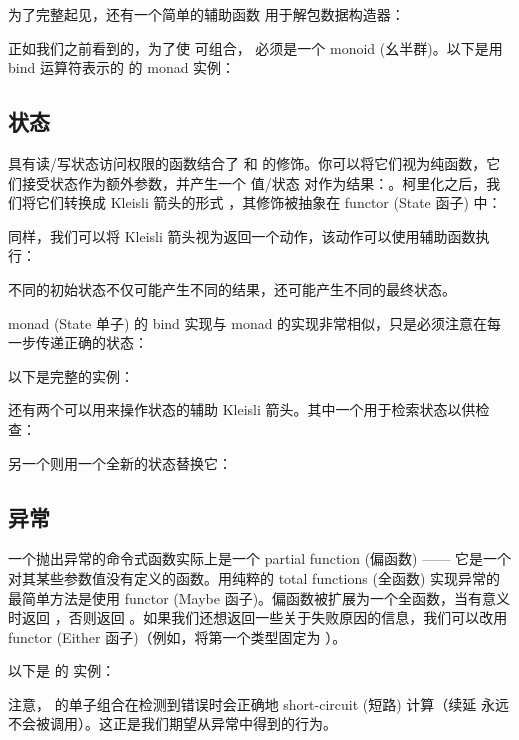 为了完整起见，还有一个简单的辅助函数  用于解包数据构造器：

正如我们之前看到的，为了使  可组合， 必须是一个 monoid (幺半群)。以下是用 bind 运算符表示的  的 monad 实例：


\subsection{状态}

具有读/写状态访问权限的函数结合了  和  的修饰。你可以将它们视为纯函数，它们接受状态作为额外参数，并产生一个 值/状态 对作为结果：。柯里化之后，我们将它们转换成 Kleisli 箭头的形式 ，其修饰被抽象在  functor (State 函子) 中：

同样，我们可以将 Kleisli 箭头视为返回一个动作，该动作可以使用辅助函数执行：

不同的初始状态不仅可能产生不同的结果，还可能产生不同的最终状态。

 monad (State 单子) 的 bind 实现与  monad 的实现非常相似，只是必须注意在每一步传递正确的状态：

以下是完整的实例：

还有两个可以用来操作状态的辅助 Kleisli 箭头。其中一个用于检索状态以供检查：

另一个则用一个全新的状态替换它：


\subsection{异常}

一个抛出异常的命令式函数实际上是一个 partial function (偏函数) —— 它是一个对其某些参数值没有定义的函数。用纯粹的 total functions (全函数) 实现异常的最简单方法是使用  functor (Maybe 函子)。偏函数被扩展为一个全函数，当有意义时返回 ，否则返回 。如果我们还想返回一些关于失败原因的信息，我们可以改用  functor (Either 函子)（例如，将第一个类型固定为 ）。

以下是  的  实例：

注意， 的单子组合在检测到错误时会正确地 short-circuit (短路) 计算（续延  永远不会被调用）。这正是我们期望从异常中得到的行为。

